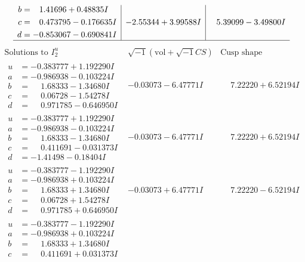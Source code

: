\documentclass[1p]{elsarticle_modified}
\theoremstyle{definition}
\newcommand{\I}{\sqrt{-1}}
\begin{document}
$$\begin{array}{c|c|c}
\begin{aligned}
b &= \phantom{-}1.41696 + 0.48835 I \\
c &= \phantom{-}0.473795 - 0.176635 I \\
d &= -0.853067 - 0.690841 I\end{aligned}
 & -2.55344 + 3.99588 I & \phantom{-}5.39099 - 3.49800 I\\
 \hline 
 \end{array}$$\newpage$$\begin{array}{c|c|c}  
\text{Solutions to }I^u_{2}& \I (\text{vol} + \sqrt{-1}CS) & \text{Cusp shape}\\
 \hline 
\begin{aligned}
u &= -0.383777 + 1.192290 I \\
a &= -0.986938 - 0.103224 I \\
b &= \phantom{-}1.68333 - 1.34680 I \\
c &= \phantom{-}0.06728 - 1.54278 I \\
d &= \phantom{-}0.971785 - 0.646950 I\end{aligned}
 & -0.03073 - 6.47771 I & \phantom{-}7.22220 + 6.52194 I \\ \hline\begin{aligned}
u &= -0.383777 + 1.192290 I \\
a &= -0.986938 - 0.103224 I \\
b &= \phantom{-}1.68333 - 1.34680 I \\
c &= \phantom{-}0.411691 - 0.031373 I \\
d &= -1.41498 - 0.18404 I\end{aligned}
 & -0.03073 - 6.47771 I & \phantom{-}7.22220 + 6.52194 I \\ \hline\begin{aligned}
u &= -0.383777 - 1.192290 I \\
a &= -0.986938 + 0.103224 I \\
b &= \phantom{-}1.68333 + 1.34680 I \\
c &= \phantom{-}0.06728 + 1.54278 I \\
d &= \phantom{-}0.971785 + 0.646950 I\end{aligned}
 & -0.03073 + 6.47771 I & \phantom{-}7.22220 - 6.52194 I \\ \hline\begin{aligned}
u &= -0.383777 - 1.192290 I \\
a &= -0.986938 + 0.103224 I \\
b &= \phantom{-}1.68333 + 1.34680 I \\
c &= \phantom{-}0.411691 + 0.031373 I \\

\end{aligned}
\end{array}$$
\end{document}
